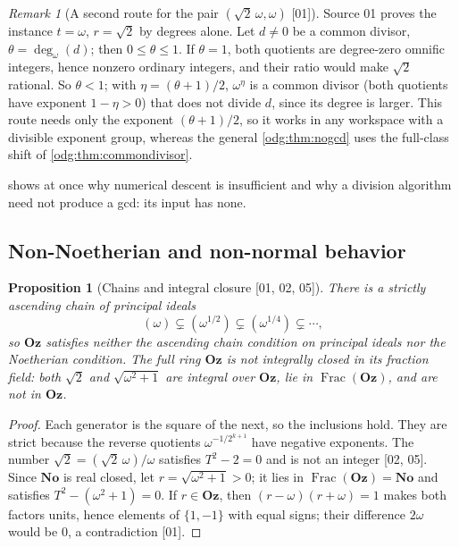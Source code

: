 \documentclass[11pt,oneside]{article}
\numberwithin{equation}{section}
\newtheorem{proposition}[proposition]{Proposition}
\theoremstyle{definition}
\theoremstyle{remark}
\newtheorem{remark}[remark]{Remark}
\newcommand{\No}{\mathbf{No}}
\newcommand{\Oz}{\mathbf{Oz}}
\newcommand{\ddeg}{\operatorname{deg}_{\omega}}
\newcommand{\Frac}{\operatorname{Frac}}
\newcommand{\src}[1]{\textup{\textsf{\small[#1]}}}
\begin{document}
\begin{remark}[A second route for the pair $(\sqrt2\,\omega,\omega)$ \src{01}]\label{odg:rem:nogcd01}\label{odg:prop:nogcd}
Source 01 proves the instance $t=\omega$, $r=\sqrt2$ by degrees alone. Let
$d\ne0$ be a common divisor, $\theta=\ddeg(d)$; then $0\le\theta\le1$. If
$\theta=1$, both quotients are degree-zero omnific integers, hence nonzero
ordinary integers, and their ratio would make $\sqrt2$ rational. So
$\theta<1$; with $\eta=(\theta+1)/2$, $\omega^\eta$ is a common divisor (both
quotients have exponent $1-\eta>0$) that does not divide $d$, since its degree
is larger. This route needs only the exponent $(\theta+1)/2$, so it works in
any workspace with a divisible exponent group, whereas the general
\cref{odg:thm:nogcd} uses the full-class shift of
\cref{odg:thm:commondivisor}.
\end{remark}

 shows at once why numerical descent is insufficient and
why a division algorithm need not produce a gcd: its input has none.

\subsection{Non-Noetherian and non-normal behavior}

\begin{proposition}[Chains and integral closure \src{01, 02, 05}]\label{odg:prop:notnormal}
There is a strictly ascending chain of principal ideals
\[
 (\omega)\subsetneq(\omega^{1/2})\subsetneq
 (\omega^{1/4})\subsetneq\cdots,
\]
so $\Oz$ satisfies neither the ascending chain condition on principal
ideals nor the Noetherian condition. The full ring $\Oz$ is not integrally
closed in its fraction field: both $\sqrt2$ and $\sqrt{\omega^2+1}$ are
integral over $\Oz$, lie in $\Frac(\Oz)$, and are not in $\Oz$.
\end{proposition}
\begin{proof}
Each generator is the square of the next, so the inclusions hold. They are
strict because the reverse quotients $\omega^{-1/2^{k+1}}$ have negative
exponents. The number $\sqrt2=(\sqrt2\,\omega)/\omega$ satisfies $T^2-2=0$
and is not an integer \src{02, 05}. Since $\No$ is real closed, let
$r=\sqrt{\omega^2+1}>0$; it lies in $\Frac(\Oz)=\No$ and satisfies
$T^2-(\omega^2+1)=0$. If $r\in\Oz$, then $(r-\omega)(r+\omega)=1$ makes both
factors units, hence elements of $\{1,-1\}$ with equal signs; their difference
$2\omega$ would be $0$, a contradiction \src{01}.
\end{proof}
\end{document}
